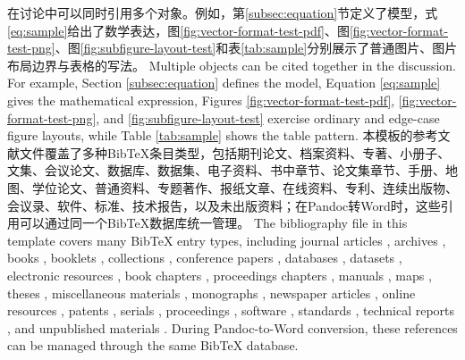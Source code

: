 \documentclass[12pt,a4paper]{article}
\begin{document}
在讨论中可以同时引用多个对象。例如，第\ref{subsec:equation}节定义了模型，式\ref{eq:sample}给出了数学表达，图\ref{fig:vector-format-test-pdf}、图\ref{fig:vector-format-test-png}、图\ref{fig:subfigure-layout-test}和表\ref{tab:sample}分别展示了普通图片、图片布局边界与表格的写法。 Multiple objects can be cited together in the discussion. For example, Section \ref{subsec:equation} defines the model, Equation \ref{eq:sample} gives the mathematical expression, Figures \ref{fig:vector-format-test-pdf}, \ref{fig:vector-format-test-png}, and \ref{fig:subfigure-layout-test} exercise ordinary and edge-case figure layouts, while Table \ref{tab:sample} shows the table pattern.
本模板的参考文献文件覆盖了多种BibTeX条目类型，包括期刊论文\cite{nightcity2077chipSideChannel,wang2047flyingBlade}、档案资料\cite{天庭巡查司648六根封存}、专著\cite{logan1023firstFlame}、小册子\cite{htt2010teaTimeRules}、文集\cite{senshi514dungeonFoodSystems}、会议论文\cite{二郎642六根分配,bridges2039timefallRouting}、数据库\cite{ofnir1320landsBetweenDatabase}、数据集\cite{heroAssociation2021disasterDataset}、电子资料\cite{alvarez2076braindanceArtifacts}、书中章节\cite{tu550moonEngineChapter}、论文集章节\cite{frieren1045memoryMagic}、手册\cite{sculptor1579prostheticManual}、地图\cite{senshi514goldenCountryMap}、学位论文\cite{gotoh2023stageNoise,sellen1214primevalCurrent}、普通资料\cite{rubicon621jobFragments}、专题著作\cite{moretti1349divinationRisk}、报纸文章\cite{usagiyama2014steamerFault}、在线资料\cite{nakano2011keionGear}、专利\cite{gustav1192priorArtTranslation}、连续出版物\cite{toyohashi2024makeineSpecial}、会议录\cite{ranni1321leyndellSymposium}、软件\cite{allmind621arenaBench}、标准\cite{centrebrain4870dysonInterface}、技术报告\cite{ueg2058heavyFusionScaleup}，以及未出版资料\cite{gotoh2023emergencyStickyNote}；在Pandoc转Word时，这些引用可以通过同一个BibTeX数据库统一管理。 The bibliography file in this template covers many BibTeX entry types, including journal articles \cite{nightcity2077chipSideChannel,wang2047flyingBlade}, archives \cite{天庭巡查司648六根封存}, books \cite{logan1023firstFlame}, booklets \cite{htt2010teaTimeRules}, collections \cite{senshi514dungeonFoodSystems}, conference papers \cite{二郎642六根分配,bridges2039timefallRouting}, databases \cite{ofnir1320landsBetweenDatabase}, datasets \cite{heroAssociation2021disasterDataset}, electronic resources \cite{alvarez2076braindanceArtifacts}, book chapters \cite{tu550moonEngineChapter}, proceedings chapters \cite{frieren1045memoryMagic}, manuals \cite{sculptor1579prostheticManual}, maps \cite{senshi514goldenCountryMap}, theses \cite{gotoh2023stageNoise,sellen1214primevalCurrent}, miscellaneous materials \cite{rubicon621jobFragments}, monographs \cite{moretti1349divinationRisk}, newspaper articles \cite{usagiyama2014steamerFault}, online resources \cite{nakano2011keionGear}, patents \cite{gustav1192priorArtTranslation}, serials \cite{toyohashi2024makeineSpecial}, proceedings \cite{ranni1321leyndellSymposium}, software \cite{allmind621arenaBench}, standards \cite{centrebrain4870dysonInterface}, technical reports \cite{ueg2058heavyFusionScaleup}, and unpublished materials \cite{gotoh2023emergencyStickyNote}. During Pandoc-to-Word conversion, these references can be managed through the same BibTeX database.
\end{document}
